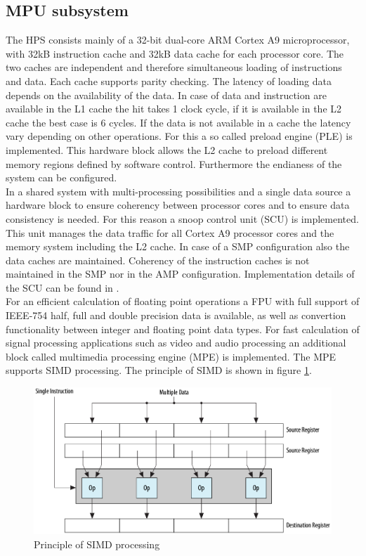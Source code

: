 \subsection{MPU subsystem}
The HPS consists mainly of a 32-bit dual-core ARM Cortex A9 microprocessor, with 32kB instruction cache and 32kB data cache for each processor core. The two caches are independent and therefore simultaneous loading of instructions and data. Each cache supports parity checking. The latency of loading data depends on the availability of the data. In case of data and instruction are available in the L1 cache the hit takes 1 clock cycle, if it is available in the L2 cache the best case is 6 cycles. If the data is not available in a cache the latency vary depending on other operations. For this a so called preload engine (PLE) is implemented. This hardware block allows the L2 cache to preload different memory regions defined by software control. Furthermore the endianess of the system can be configured.\\
In a shared system with multi-processing possibilities and a single data source a hardware block to ensure coherency between processor cores and to ensure data consistency is needed. For this reason a snoop control unit (SCU) is implemented. This unit manages the data traffic for all Cortex A9 processor cores and the memory system including the L2 cache. In case of a SMP configuration also the data caches are maintained. Coherency of the instruction caches is not maintained in the SMP nor in the AMP configuration. Implementation details of the SCU can be found in \cite[chapter 9]{AlteraHPS15}.\\
For an efficient calculation of floating point operations a FPU with full support of IEEE-754 half, full and double precision data is available, as well as convertion functionality between integer and floating point data types. For fast calculation of signal processing applications such as video and audio processing an additional block called multimedia processing engine (MPE) is implemented. The MPE supports SIMD processing. The principle of SIMD is shown in figure \ref{fig:alterahpssimd}.
\begin{figure}[htbp]
\begin{center}
\includegraphics[width=12cm,keepaspectratio=true]{bilder/png/SIMD}
\caption{Principle of SIMD processing\cite[chapter 9]{AlteraHPS15}}
\label{fig:alterahpssimd}
\end{center}
\end{figure}
